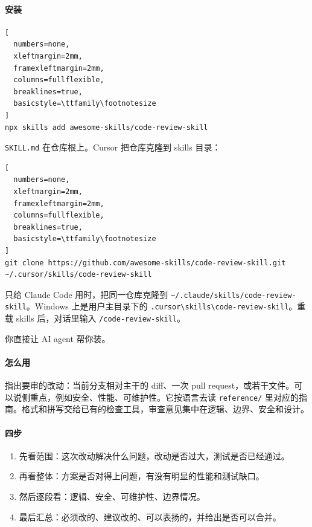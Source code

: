 \paragraph{安装}
\begin{lstlisting}[
  numbers=none,
  xleftmargin=2mm,
  framexleftmargin=2mm,
  columns=fullflexible,
  breaklines=true,
  basicstyle=\ttfamily\footnotesize
]
npx skills add awesome-skills/code-review-skill
\end{lstlisting}
\verb|SKILL.md| 在仓库根上。Cursor 把仓库克隆到 skills 目录：
\begin{lstlisting}[
  numbers=none,
  xleftmargin=2mm,
  framexleftmargin=2mm,
  columns=fullflexible,
  breaklines=true,
  basicstyle=\ttfamily\footnotesize
]
git clone https://github.com/awesome-skills/code-review-skill.git ~/.cursor/skills/code-review-skill
\end{lstlisting}
只给 Claude Code 用时，把同一仓库克隆到 \verb|~/.claude/skills/code-review-skill|。Windows 上是用户主目录下的 \verb|.cursor\skills\code-review-skill|。重载 skills 后，对话里输入 \verb|/code-review-skill|。

\begin{xiaonao}
你直接让 AI agent 帮你装。
\end{xiaonao}

\paragraph{怎么用}
指出要审的改动：当前分支相对主干的 diff、一次 pull request，或若干文件。可以说侧重点，例如安全、性能、可维护性。它按语言去读 \verb|reference/| 里对应的指南。格式和拼写交给已有的检查工具，审查意见集中在逻辑、边界、安全和设计。

\paragraph{四步}
\begin{enumerate}
\item 先看范围：这次改动解决什么问题，改动是否过大，测试是否已经通过。
\item 再看整体：方案是否对得上问题，有没有明显的性能和测试缺口。
\item 然后逐段看：逻辑、安全、可维护性、边界情况。
\item 最后汇总：必须改的、建议改的、可以表扬的，并给出是否可以合并。
\end{enumerate}

